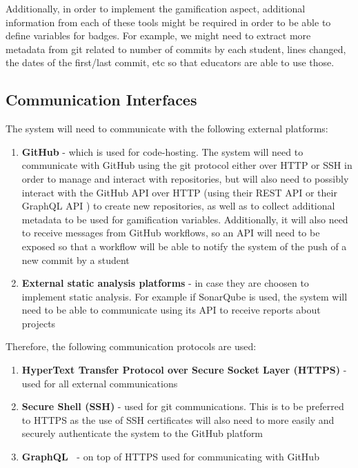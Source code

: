 Additionally, in order to implement the gamification aspect, additional information
from each of these tools might be required in order to be able to define variables
for badges. For example, we might need to extract more metadata from git
related to number of commits by each student, lines changed, the dates of
the first/last commit, etc so that educators are able to use those.

\subsection{Communication Interfaces}
The system will need to communicate with the following external platforms:
\begin{enumerate}
      \item \textbf{GitHub} {-} which is used for code-hosting. The system will need to
            communicate with GitHub using the git protocol either over HTTP or SSH in order
            to manage and interact with repositories, but will also need to possibly interact
            with the GitHub API over HTTP (using their REST API \cite{GitHubRest}
            or their GraphQL API \cite{GitHubGraphQL}) to
            create new repositories, as well as to collect additional metadata to be used
            for gamification variables. Additionally, it will also need to receive messages
            from GitHub workflows, so an API will need to be exposed so that a workflow
            will be able to notify the system of the push of a new commit by a student
      \item \textbf{External static analysis platforms} {-} in case they are choosen to
            implement static analysis. For example if SonarQube is used, the system will
            need to be able to communicate using its API to receive reports about projects \cite{SonarQubeExt}
\end{enumerate}

Therefore, the following communication protocols are used:
\begin{enumerate}
      \item \textbf{HyperText Transfer Protocol over Secure Socket Layer (HTTPS)} {-} used
            for all external communications
      \item \textbf{Secure Shell (SSH)} {-} used for git communications. This is to be
            preferred to HTTPS as the use of SSH certificates will also need to more easily
            and securely authenticate the system to the GitHub platform \cite{GitHubSSH}
      \item \textbf{GraphQL~\cite{GraphQL}} {-} on top of HTTPS used for communicating with GitHub
\end{enumerate}

